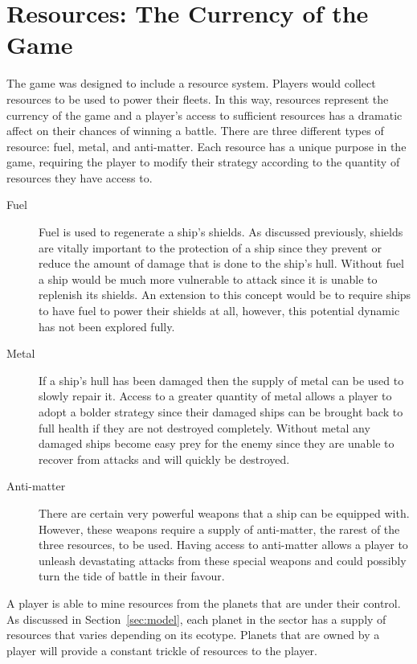 \section{Resources: The Currency of the Game}

The game was designed to include a resource system. Players would collect resources to be used to power their fleets. In this way, resources represent the currency of the game and a player's access to sufficient resources has a dramatic affect on their chances of winning a battle. There are three different types of resource: fuel, metal, and anti-matter. Each resource has a unique purpose in the game, requiring the player to modify their strategy according to the quantity of resources they have access to.

\begin{description}
\item[Fuel] Fuel is used to regenerate a ship's shields. As discussed previously, shields are vitally important to the protection of a ship since they prevent or reduce the amount of damage that is done to the ship's hull. Without fuel a ship would be much more vulnerable to attack since it is unable to replenish its shields. An extension to this concept would be to require ships to have fuel to power their shields at all, however, this potential dynamic has not been explored fully.

\item[Metal] If a ship's hull has been damaged then the supply of metal can be used to slowly repair it. Access to a greater quantity of metal allows a player to adopt a bolder strategy since their damaged ships can be brought back to full health if they are not destroyed completely. Without metal any damaged ships become easy prey for the enemy since they are unable to recover from attacks and will quickly be destroyed.

\item[Anti-matter] There are certain very powerful weapons that a ship can be equipped with. However, these weapons require a supply of anti-matter, the rarest of the three resources, to be used. Having access to anti-matter allows a player to unleash devastating attacks from these special weapons and could possibly turn the tide of battle in their favour.
\end{description}
\noindent
A player is able to mine resources from the planets that are under their control. As discussed in Section~\ref{sec:model}, each planet in the sector has a supply of resources that varies depending on its ecotype. Planets that are owned by a player will provide a constant trickle of resources to the player.

